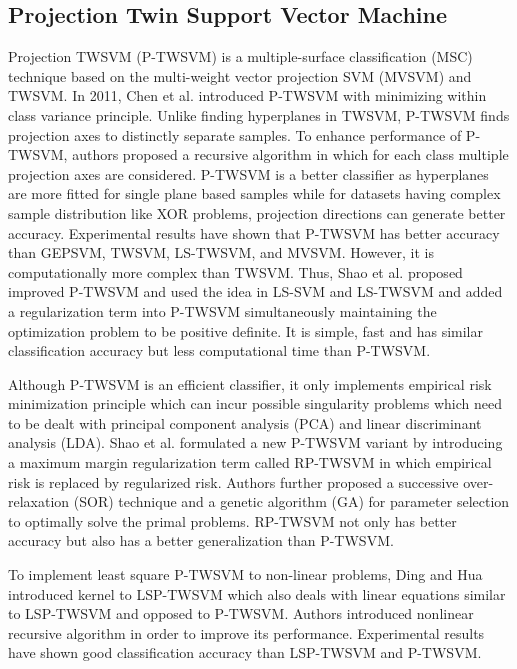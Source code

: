 \documentclass[pdflatex,sn-mathphys]{sn-jnl}%
\theoremstyle{thmstyleone}%
\theoremstyle{thmstyletwo}%
\theoremstyle{thmstylethree}%
\begin{document}
\subsection{Projection Twin Support Vector Machine}
\noindent
\newline
Projection TWSVM (P-TWSVM) \cite{chen2011recursive} is a multiple-surface classification (MSC) technique based on the multi-weight vector projection SVM (MVSVM) and TWSVM. In 2011, Chen et al. \cite{chen2011recursive} introduced P-TWSVM with minimizing within class variance principle. Unlike finding hyperplanes in TWSVM, P-TWSVM finds projection axes to distinctly separate samples. To enhance performance of P-TWSVM, authors proposed a recursive algorithm in which for each class multiple projection axes are considered. P-TWSVM is a better classifier as hyperplanes are more fitted for single plane based samples while for datasets having complex sample distribution like XOR problems, projection directions can generate better accuracy. Experimental results have shown that P-TWSVM has better accuracy than GEPSVM, TWSVM, LS-TWSVM, and MVSVM. However, it is computationally more complex than TWSVM. Thus, Shao et al. \cite {shao2012least} proposed improved P-TWSVM and used the idea in LS-SVM \cite{suykens1999least} and LS-TWSVM \cite{kumar2010knowledge} and added a regularization term into P-TWSVM simultaneously maintaining the optimization problem to be positive definite. It is simple, fast and has similar classification accuracy but less computational time than P-TWSVM. 

Although P-TWSVM is an efficient classifier, it only implements empirical risk minimization principle which can incur possible singularity problems which need to be dealt with principal component analysis (PCA) and linear discriminant analysis (LDA). Shao et al. \cite{shao2013regularization} formulated a new P-TWSVM variant by introducing a maximum margin regularization term called RP-TWSVM in which empirical risk is replaced by regularized risk. Authors further proposed a successive over-relaxation (SOR) technique and a genetic algorithm (GA) for parameter selection to optimally solve the primal problems. RP-TWSVM not only has better accuracy but also has a better generalization than P-TWSVM.

To implement least square P-TWSVM to non-linear problems, Ding and Hua \cite{ding2014recursive} introduced kernel to LSP-TWSVM \cite{shao2012least} which also deals with linear equations similar to LSP-TWSVM and opposed to P-TWSVM. Authors introduced nonlinear recursive algorithm in order to improve its performance. Experimental results have shown good classification accuracy than LSP-TWSVM and P-TWSVM.
\end{document}
